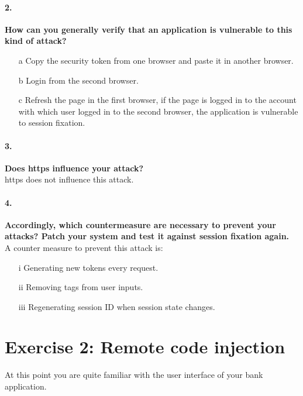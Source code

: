 \documentclass[12pt]{report}
\begin{document}
	\paragraph*{2.}{\bf  How can you generally verify that an application is vulnerable to this kind of attack?}\\
	
	\begin{itemize}
		
		\item[a] Copy the security token from one browser and paste it in another browser.
		\item[b] Login from the second browser.
		\item[c] Refresh the page in the first browser, if the page is logged in to the account with which user logged in to the second browser, the application is vulnerable to session fixation.
	\end{itemize}
	
	\paragraph*{3.}{\bf Does https influence your attack?}\\
	
	https does not influence this attack.
	
	\paragraph*{4.}{\bf Accordingly, which countermeasure are necessary to prevent your attacks? Patch your system and test it against session fixation again.}\\
	
	A counter measure to prevent this attack is:
	
	\begin{itemize}
		\item[i] Generating new tokens every request.
		\item[ii] Removing tags from user inputs.
		\item[iii] Regenerating session ID when session state changes.
		
	\end{itemize}
	
	
	\section*{Exercise 2: Remote code injection}
	
	At this point you are quite familiar with the user interface of your bank application.
	
\end{document}
